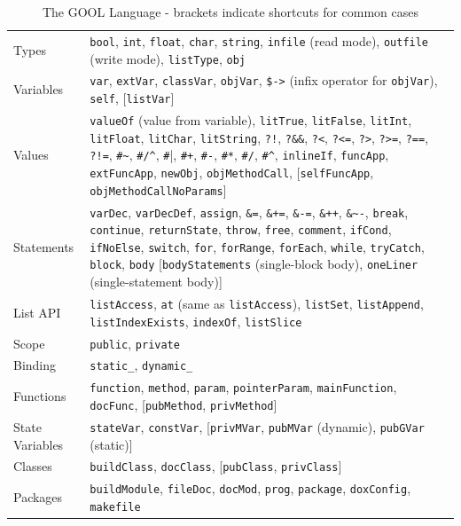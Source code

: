 \documentclass[sigplan,review,prologue,dvipsnames]{acmart}
\begin{document}
\begin{table}[t]
  \caption{The GOOL Language - brackets indicate shortcuts for common cases}
  \begin{tabular}{p{2.2cm}| p{15cm}}
    Types & \verb|bool|, \verb|int|, \verb|float|, \verb|char|, 
    \verb|string|, 
    \verb|infile| (read mode), \verb|outfile| (write mode), 
    \verb|listType|, 
    \verb|obj| \\
    Variables & \verb|var|, \verb|extVar|, \verb|classVar|, \verb|objVar|, 
    \verb|$->| (infix operator for \verb|objVar|), \verb|self|,
    [\verb|listVar|] \\
    Values & \verb|valueOf| (value from variable), \verb|litTrue|, 
    \verb|litFalse|, \verb|litInt|, 
    \verb|litFloat|, \verb|litChar|, \verb|litString|, \verb|?!|, 
    \verb|?&&|, 
    \verb|?<|, \verb|?<=|, \verb|?>|, \verb|?>=|, \verb|?==|, \verb|?!=|, 
    \verb|#~|, \verb|#/^|, \verb|#||, \verb|#+|, \verb|#-|, \verb|#*|, 
    \verb|#/|, \verb|#^|, \verb|inlineIf|, \verb|funcApp|, 
    \verb|extFuncApp|, 
    \verb|newObj|, \verb|objMethodCall|, [\verb|selfFuncApp|, 
    \verb|objMethodCallNoParams|] \\
    Statements & \verb|varDec|, \verb|varDecDef|, \verb|assign|, \verb|&=|, 
    \verb|&+=|, \verb|&-=|, \verb|&++|, \verb|&~-|, \verb|break|, 
    \verb|continue|, \verb|returnState|, \verb|throw|, \verb|free|, 
    \verb|comment|, \verb|ifCond|, \verb|ifNoElse|, \verb|switch|, 
    \verb|for|, 
    \verb|forRange|, \verb|forEach|, \verb|while|, \verb|tryCatch|, 
    \verb|block|, \verb|body| [\verb|bodyStatements| (single-block body), 
    \verb|oneLiner| (single-statement body)] \\
    List API & \verb|listAccess|, \verb|at| (same as \verb|listAccess|), 
    \verb|listSet|, \verb|listAppend|, \verb|listIndexExists|, 
    \verb|indexOf|, \verb|listSlice| \\
    Scope & \verb|public|, \verb|private| \\
    Binding & \verb|static_|, \verb|dynamic_| \\
    Functions & \verb|function|, \verb|method|, \verb|param|, 
    \verb|pointerParam|, \verb|mainFunction|, \verb|docFunc|, 
    [\verb|pubMethod|, \verb|privMethod|] \\
    State Variables & \verb|stateVar|, \verb|constVar|, [\verb|privMVar|, 
    \verb|pubMVar| (dynamic), \verb|pubGVar| (static)]\\
    Classes & \verb|buildClass|, \verb|docClass|, [\verb|pubClass|, 
    \verb|privClass|]\\
    Packages & \verb|buildModule|, \verb|fileDoc|, \verb|docMod|, 
    \verb|prog|, 
    \verb|package|, \verb|doxConfig|, \verb|makefile|
  \end{tabular}
  \label{tab:syntax}
\end{table}
\end{document}
